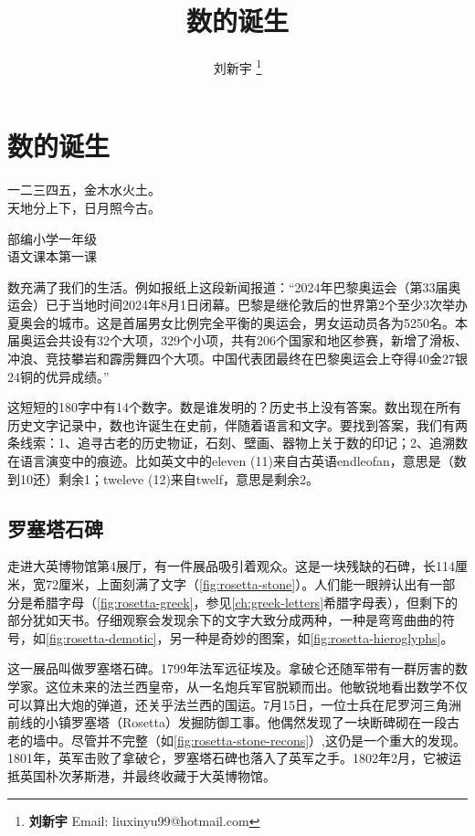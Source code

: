 \documentclass[b5paper]{ctexart}
\begin{document}
\title{数的诞生}

\author{刘新宇
\thanks{{\bfseries 刘新宇} \newline
  Email: liuxinyu99@hotmail.com \newline}
  }

\maketitle
\fi


\ifx\wholebook\relax
\chapter{数的诞生}
\fi

\epigraph{一二三四五，金木水火土。\\ 
天地分上下，日月照今古。}{部编小学一年级\\
语文课本第一课}

数充满了我们的生活。例如报纸上这段新闻报道：“2024年巴黎奥运会（第33届奥运会）已于当地时间2024年8月1日闭幕。巴黎是继伦敦后的世界第2个至少3次举办夏奥会的城市。这是首届男女比例完全平衡的奥运会，男女运动员各为5250名。本届奥运会共设有32个大项，329个小项，共有206个国家和地区参赛，新增了滑板、冲浪、竞技攀岩和霹雳舞四个大项。中国代表团最终在巴黎奥运会上夺得40金27银24铜的优异成绩。”

这短短的180字中有14个数字。数是谁发明的？历史书上没有答案。数出现在所有历史文字记录中，数也许诞生在史前，伴随着语言和文字。要找到答案，我们有两条线索：1、追寻古老的历史物证，石刻、壁画、器物上关于数的印记；2、追溯数在语言演变中的痕迹。比如英文中的eleven (11)来自古英语endleofan，意思是（数到10还）剩余1；tweleve (12)来自twelf，意思是剩余2。

\section{罗塞塔石碑}

走进大英博物馆第4展厅，有一件展品吸引着观众。这是一块残缺的石碑，长114厘米，宽72厘米，上面刻满了文字（\cref{fig:rosetta-stone}）。人们能一眼辨认出有一部分是希腊字母（\cref{fig:rosetta-greek}，参见\cref{ch:greek-letters}希腊字母表），但剩下的部分犹如天书。仔细观察会发现余下的文字大致分成两种，一种是弯弯曲曲的符号，如\cref{fig:rosetta-demotic}，另一种是奇妙的图案，如\cref{fig:rosetta-hieroglyphs}。

这一展品叫做罗塞塔石碑。1799年法军远征埃及。拿破仑还随军带有一群厉害的数学家。这位未来的法兰西皇帝，从一名炮兵军官脱颖而出。他敏锐地看出数学不仅可以算出大炮的弹道，还关乎法兰西的国运。7月15日，一位士兵在尼罗河三角洲前线的小镇罗塞塔（Rosetta）发掘防御工事。他偶然发现了一块断碑砌在一段古老的墙中。尽管并不完整（如\cref{fig:rosetta-stone-recons}）,这仍是一个重大的发现。1801年，英军击败了拿破仑，罗塞塔石碑也落入了英军之手。1802年2月，它被运抵英国朴次茅斯港，并最终收藏于大英博物馆。
\end{document}
